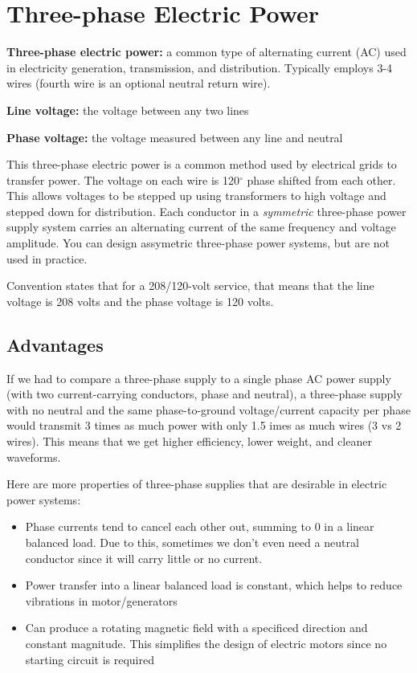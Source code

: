 \section{Three-phase Electric Power}
\begin{pline}
    \item \textbf{Three-phase electric power:} a common type of alternating current (AC) used in electricity generation, transmission, and distribution. Typically employs 3-4 wires (fourth wire is an optional neutral return wire).
    \item \textbf{Line voltage:} the voltage between any two lines
    \item \textbf{Phase voltage:} the voltage measured between any line and neutral
\end{pline}
This three-phase electric power is a common method used by electrical grids to transfer power. The voltage on each wire is 120$^\circ$ phase shifted from each other. This allows voltages to be stepped up using transformers to high voltage and stepped down for distribution. Each conductor in a \textit{symmetric} three-phase power supply system carries an alternating current of the same frequency and voltage amplitude. You can design assymetric three-phase power systems, but are not used in practice.

Convention states that for a 208/120-volt service, that means that the line voltage is 208 volts and the phase voltage is 120 volts.

\subsection{Advantages}
If we had to compare a three-phase supply to a single phase AC power supply (with two current-carrying conductors, phase and neutral), a three-phase supply with no neutral and the same phase-to-ground voltage/current capacity per phase would transmit 3 times as much power with only 1.5 imes as much wires (3 vs 2 wires). This means that we get higher efficiency, lower weight, and cleaner waveforms.

Here are more properties of three-phase supplies that are desirable in electric power systems:
\begin{itemize}
    \item Phase currents tend to cancel each other out, summing to 0 in a linear balanced load. Due to this, sometimes we don't even need a neutral conductor since it will carry little or no current.
    \item Power transfer into a linear balanced load is constant, which helps to reduce vibrations in motor/generators
    \item Can produce a rotating magnetic field with a specificed direction and constant magnitude. This simplifies the design of electric motors since no starting circuit is required
\end{itemize}

